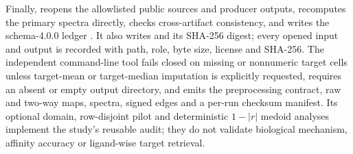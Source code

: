 Finally,  reopens the allowlisted
public sources and producer outputs, recomputes the primary spectra directly,
checks cross-artifact consistency, and writes the schema-4.0.0 ledger
.  It also writes
 and its SHA-256 digest; every
opened input and output is recorded with path, role, byte size, license and
SHA-256.  The independent  command-line tool
fails closed on missing or nonnumeric target cells unless target-mean or
target-median imputation is explicitly requested, requires an absent or empty
output directory, and emits the preprocessing contract, raw and two-way maps,
spectra, signed edges and a per-run checksum manifest.  Its optional domain,
row-disjoint pilot and deterministic $1-|r|$ medoid analyses implement the
study's reusable audit; they do not validate biological mechanism, affinity
accuracy or ligand-wise target retrieval.
